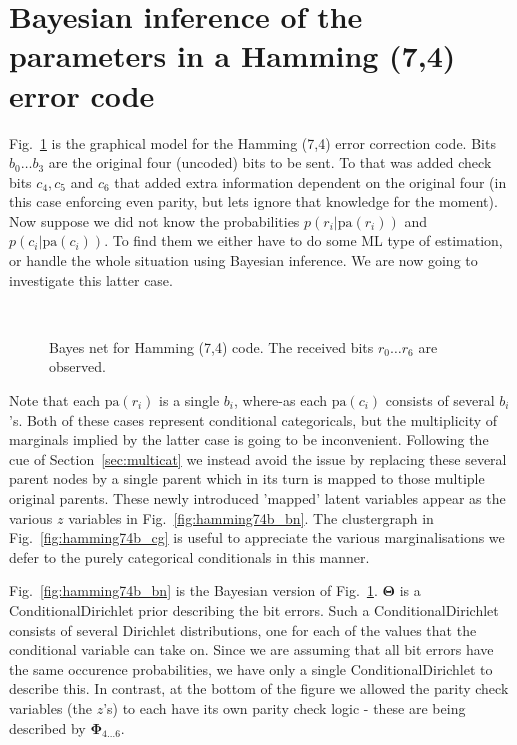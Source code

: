 \documentclass[oneside,english]{scrbook}
\begin{document}
\section*{Bayesian inference of the parameters in a Hamming (7,4) error code}

Fig.~\ref{fig:hamming74a_bn} is the graphical model for the Hamming
(7,4) error correction code. Bits $b_0 \ldots b_3$ are the original
four (uncoded) bits to be sent. To that was added check bits $c_4,c_5$
and $c_6$ that added extra information dependent on the original four
(in this case enforcing even parity, but lets ignore that knowledge
for the moment). Now suppose we did not know the probabilities
$p(r_i|\text{pa}(r_i))$ and $p(c_i|\text{pa}(c_i))$. To find them we
either have to do some ML type of estimation, or handle the whole
situation using Bayesian inference. We are now going to investigate
this latter case.

\begin{figure}[htb]
  \begin{centering}
    \\
    \caption{Bayes net for Hamming (7,4) code. The received bits
      $r_0\ldots r_6$ are observed.\label{fig:hamming74a_bn} }
  \end{centering}
\end{figure}

Note that each $\text{pa}(r_i)$ is a single $b_i$, where-as each
$\text{pa}(c_i)$ consists of several $b_i$'s. Both of these cases
represent conditional categoricals, but the multiplicity of marginals
implied by the latter case is going to be inconvenient. Following the
cue of Section~\ref{sec:multicat} we instead avoid the issue by
replacing these several parent nodes by a single parent which in its
turn is mapped to those multiple original parents. These newly
introduced 'mapped' latent variables appear as the various $z$
variables in Fig.~\ref{fig:hamming74b_bn}. The clustergraph in
Fig.~\ref{fig:hamming74b_cg} is useful to appreciate the various
marginalisations we defer to the purely categorical conditionals in
this manner.

Fig.~\ref{fig:hamming74b_bn} is the Bayesian version of
Fig.~\ref{fig:hamming74a_bn}. $\bm{\Theta}$ is a ConditionalDirichlet
prior describing the bit errors. Such a ConditionalDirichlet consists
of several Dirichlet distributions, one for each of the values that
the conditional variable can take on. Since we are assuming that all
bit errors have the same occurence probabilities, we have only a
single ConditionalDirichlet to describe this. In contrast, at the
bottom of the figure we allowed the parity check variables (the $z$'s)
to each have its own parity check logic - these are being described by
$\bm{\Phi}_{4\ldots 6}$.
\end{document}
